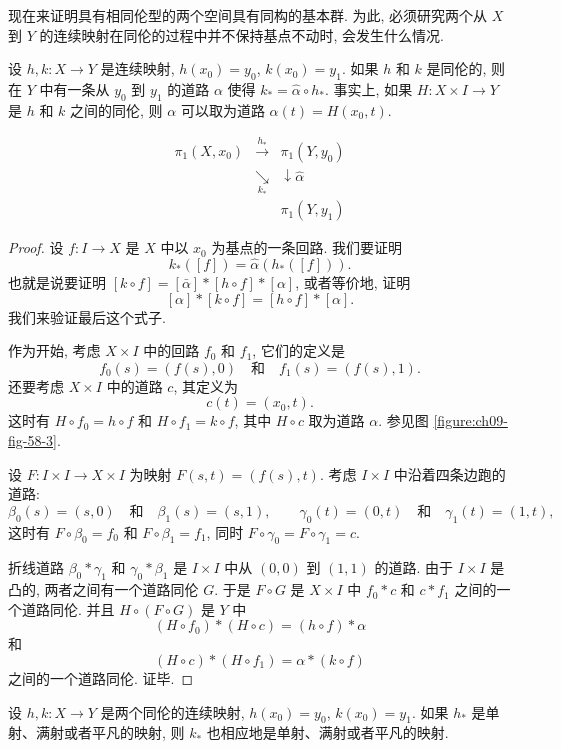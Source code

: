 现在来证明具有相同伦型的两个空间具有同构的基本群. 为此, 必须研究两个从 $X$ 到 $Y$ 的连续映射在同伦的过程中并不保持基点不动时, 会发生什么情况.

\begin{lemma}
\label{lemma:ch09-sec58-58-4}
设 $h,k\colon X\to Y$ 是连续映射, $h(x_0)=y_0$, $k(x_0)=y_1$. 如果 $h$ 和 $k$ 是同伦的, 则在 $Y$ 中有一条从 $y_0$ 到 $y_1$ 的道路 $\alpha$ 使得 $k_*=\hat{\alpha}\circ h_*$. 事实上, 如果 $H\colon X\times I\to Y$ 是 $h$ 和 $k$ 之间的同伦, 则 $\alpha$ 可以取为道路 $\alpha(t)=H(x_0,t)$.
\end{lemma}

\[
\begin{array}{ccc}
\pi_{1}(X,x_{0}) & \xrightarrow{h_{*}} & \pi_{1}(Y,y_{0})\\
 & \underset{k_{*}}{\searrow} & \downarrow{\scriptstyle\hat{\alpha}}\\
 & & \pi_{1}(Y,y_{1})
\end{array}
\]


\begin{proof}
设 $f\colon I\to X$ 是 $X$ 中以 $x_0$ 为基点的一条回路. 我们要证明
\[
k_{*}([f])=\hat{\alpha}(h_{*}([f])).
\]
也就是说要证明 $[k\circ f]=[\bar{\alpha}]*[h\circ f]*[\alpha]$, 或者等价地, 证明
\[
[\alpha]*[k\circ f]=[h\circ f]*[\alpha].
\]
我们来验证最后这个式子.

作为开始, 考虑 $X\times I$ 中的回路 $f_0$ 和 $f_1$, 它们的定义是
\[
f_{0}(s)=(f(s),0)\quad\text{和}\quad f_{1}(s)=(f(s),1).
\]
还要考虑 $X\times I$ 中的道路 $c$, 其定义为
\[
c(t)=(x_{0},t).
\]
这时有 $H\circ f_0=h\circ f$ 和 $H\circ f_1=k\circ f$, 其中 $H\circ c$ 取为道路 $\alpha$. 参见图 \cref{figure:ch09-fig-58-3}.


设 $F\colon I\times I\to X\times I$ 为映射 $F(s,t)=(f(s),t)$. 考虑 $I\times I$ 中沿着四条边跑的道路:
\[
\beta_{0}(s)=(s,0)\quad\text{和}\quad\beta_{1}(s)=(s,1),\qquad
\gamma_{0}(t)=(0,t)\quad\text{和}\quad\gamma_{1}(t)=(1,t),
\]
这时有 $F\circ\beta_0=f_0$ 和 $F\circ\beta_1=f_1$, 同时 $F\circ\gamma_0=F\circ\gamma_1=c$.

折线道路 $\beta_0*\gamma_1$ 和 $\gamma_0*\beta_1$ 是 $I\times I$ 中从 $(0,0)$ 到 $(1,1)$ 的道路. 由于 $I\times I$ 是凸的, 两者之间有一个道路同伦 $G$. 于是 $F\circ G$ 是 $X\times I$ 中 $f_0*c$ 和 $c*f_1$ 之间的一个道路同伦. 并且 $H\circ(F\circ G)$ 是 $Y$ 中
\[
(H\circ f_{0})*(H\circ c)=(h\circ f)*\alpha
\]
和
\[
(H\circ c)*(H\circ f_{1})=\alpha*(k\circ f)
\]
之间的一个道路同伦. 证毕.
\end{proof}

\begin{corollary}
\label{corollary:ch09-sec58-58-5}
设 $h,k\colon X\to Y$ 是两个同伦的连续映射, $h(x_0)=y_0$, $k(x_0)=y_1$. 如果 $h_*$ 是单射、满射或者平凡的映射, 则 $k_*$ 也相应地是单射、满射或者平凡的映射.
\end{corollary}

